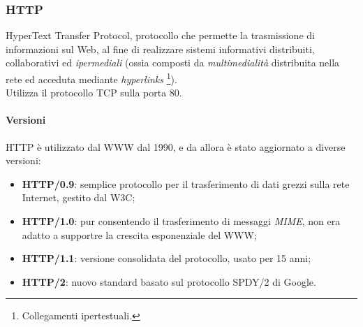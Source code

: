 \documentclass[a4paper,11pt]{article}
\begin{document}
 \subsubsection{HTTP}
 HyperText Transfer Protocol, protocollo che permette la trasmissione di informazioni sul Web, al fine di realizzare sistemi informativi distribuiti, collaborativi ed \textit{ipermediali} (ossia composti da \textit{multimedialità} distribuita nella rete ed acceduta mediante \textit{hyperlinks} \footnote{Collegamenti ipertestuali.}). \\Utilizza il protocollo TCP sulla porta 80.
\paragraph{Versioni} HTTP è utilizzato dal WWW dal 1990, e da allora è stato aggiornato a diverse versioni:
\begin{itemize}
\item \textbf{HTTP/0.9}: semplice protocollo per il trasferimento di dati grezzi sulla rete Internet, gestito dal W3C;
\item \textbf{HTTP/1.0}: pur consentendo il trasferimento di messaggi \textit{MIME}, non era adatto a supportre la crescita esponenziale del WWW;
\item \textbf{HTTP/1.1}: versione consolidata del protocollo, usato per 15 anni;
\item \textbf{HTTP/2}: nuovo standard basato sul protocollo SPDY/2 di Google.
\end{itemize}
\end{document}
